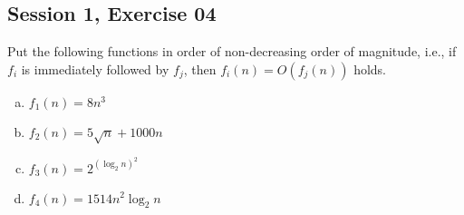 \subsection{Session 1, Exercise 04}


Put the following functions in order of non-decreasing order of magnitude, i.e., if $f_i$ is immediately followed by $f_j$, then $f_i(n) = O(f_j(n))$ holds.

\begin{enumerate}[a.)]
\item $f_1(n) = 8n^3$
\item $f_2(n) = 5\sqrt{n} + 1000n$
\item $f_3(n) = 2^{(\log_{2}n)^2}$
\item $f_4(n) = 1514n^{2}\log_{2}n$
\end{enumerate}

